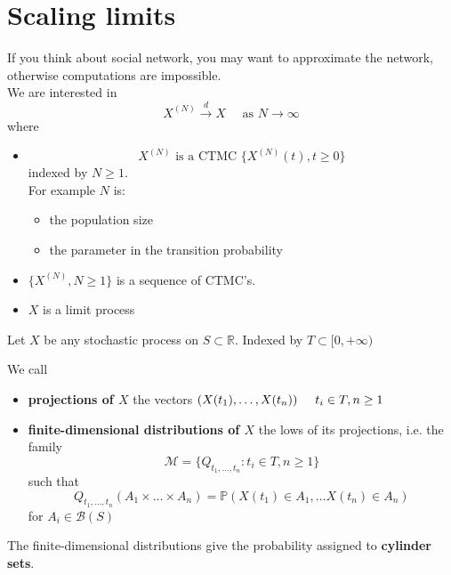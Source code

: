 \documentclass{article}
\begin{document}
\section{Scaling limits}
If you think about social network, you may want to approximate the network, otherwise computations are impossible.\\
We are interested in 
\begin{equation*}
	X^{(N)} \xrightarrow{d} X \quad \text{ as } N \rightarrow \infty
\end{equation*}
where 
\begin{itemize}
	\item
	\begin{equation*}
		X^{(N)} \text{ is a CTMC } \{X^{(N)}(t), t \geq 0\} 
	\end{equation*}
	indexed by $N \geq 1$.\\
	For example $N$ is:
	\begin{itemize}
		\item the population size
		\item the parameter in the transition probability
	\end{itemize} 
	\item $\{X^{(N)}, N \geq 1\}$ is a  sequence of CTMC's. 
	\item $X$ is a limit process
\end{itemize}
Let $X$ be any stochastic process on $S \subset \mathbb{R}$. Indexed by $T \subset [0, +\infty) $
\begin{definition}
	We call 
	\begin{itemize}
		\item \textbf{projections of $X$} the vectors $(X(t_1), \ldots, X(t_n)) \hspace{0.5 cm} t_i \in T, n \geq 1$  
		\item  \textbf{finite-dimensional distributions of $X$} the lows of its projections, i.e. the family 
		\begin{equation*}
			\mathcal{M} = \{Q_{t_1, \ldots, t_n}: t_i \in T, n \geq 1\}
		\end{equation*}
		such that 
		\begin{equation*}
			Q_{t_1, \ldots, t_n} (A_1\times \dots \times A_n)= \mathbb{P} (X(t_1)\in A_1, \dots X(t_n)\in A_n )
		\end{equation*}
		for $A_i \in \mathcal{B}(S)$
	\end{itemize}
\end{definition}
The finite-dimensional distributions give the probability assigned to \textbf{cylinder sets}.
\end{document}
